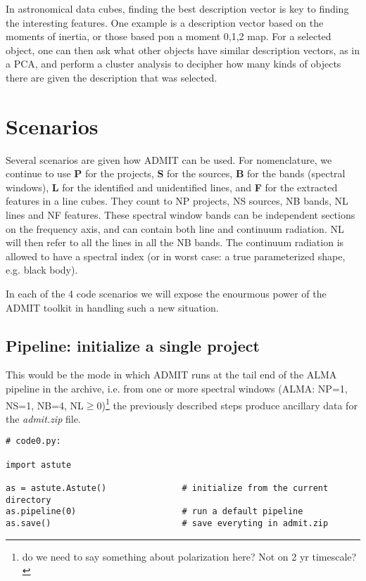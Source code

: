 \documentclass[preprint]{aastex} %
\begin{document}
In astronomical data cubes, finding the best description vector is key
to finding the interesting features. One example is a description
vector based on the moments of inertia, or those based pon a moment
0,1,2 map.  For a selected object, one can then ask what other objects
have similar description vectors, as in a PCA, and perform a cluster
analysis to decipher how many kinds of objects there are given the
description that was selected.



\section{Scenarios}

Several scenarios are given how ADMIT can be used.  For nomenclature, we continue
to use {\bf P} for
the projects, {\bf S} for the sources, {\bf B} for the bands (spectral windows), 
{\bf L} for the identified and unidentified lines, and {\bf F} for the extracted
features in a line cubes. They count to 
NP projects, NS sources, NB bands, NL lines and NF features.
These spectral window bands can be independent sections on the frequency axis, 
and can contain both line and continuum radiation. NL will then refer to all the
lines in all the NB bands.
The continuum radiation is allowed to have a spectral 
index (or in worst case: a true parameterized shape, e.g. black body).


In each of the 4 code scenarios we will expose the enourmous power of the
ADMIT toolkit in handling such a new situation.

\subsection{Pipeline: initialize a single project}

This would be the mode in which ADMIT runs at the tail end of the ALMA pipeline
in the archive, i.e. from one or more spectral
windows (ALMA: NP=1, NS=1, NB=4, NL$\ge$0)\footnote{do we need to say something about 
polarization here? Not on 2 yr timescale?} 
the previously described steps produce ancillary data for the
{\it admit.zip} file.

\footnotesize
\begin{verbatim}
# code0.py:

import astute

as = astute.Astute()               # initialize from the current directory
as.pipeline(0)                     # run a default pipeline
as.save()                          # save everyting in admit.zip

\end{verbatim}
\normalsize
\end{document}
